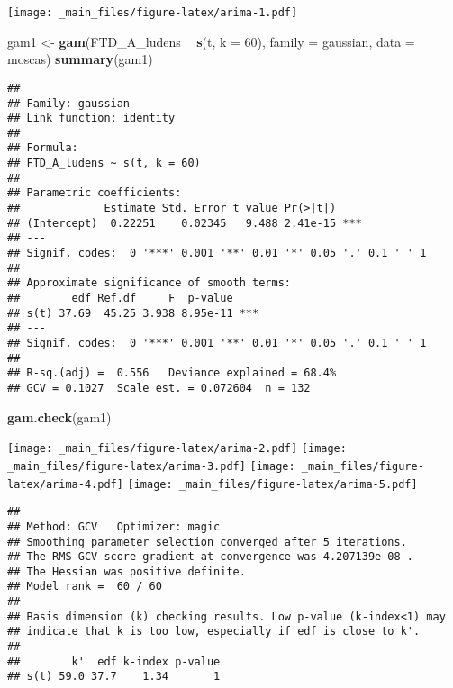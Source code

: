 \documentclass[
]{book}
\newenvironment{Shaded}{\begin{snugshade}}{\end{snugshade}}
\newcommand{\DataTypeTok}[1]{\textcolor[rgb]{0.13,0.29,0.53}{#1}}
\newcommand{\DecValTok}[1]{\textcolor[rgb]{0.00,0.00,0.81}{#1}}
\newcommand{\KeywordTok}[1]{\textcolor[rgb]{0.13,0.29,0.53}{\textbf{#1}}}
\newcommand{\NormalTok}[1]{#1}
\newcommand{\OperatorTok}[1]{\textcolor[rgb]{0.81,0.36,0.00}{\textbf{#1}}}
\newcommand{\StringTok}[1]{\textcolor[rgb]{0.31,0.60,0.02}{#1}}
\begin{document}
\begin{Shaded}
\end{Shaded}

\texttt{[image: \_main\_files/figure-latex/arima-1.pdf]}

\begin{Shaded}
\begin{Highlighting}[]
\NormalTok{gam1 <-}\StringTok{ }\KeywordTok{gam}\NormalTok{(FTD_A_ludens }\OperatorTok{~}\StringTok{ }\KeywordTok{s}\NormalTok{(t, }\DataTypeTok{k =} \DecValTok{60}\NormalTok{), }\DataTypeTok{family =}\NormalTok{ gaussian, }\DataTypeTok{data =}\NormalTok{ moscas)}
\KeywordTok{summary}\NormalTok{(gam1)}
\end{Highlighting}
\end{Shaded}

\begin{verbatim}
## 
## Family: gaussian 
## Link function: identity 
## 
## Formula:
## FTD_A_ludens ~ s(t, k = 60)
## 
## Parametric coefficients:
##             Estimate Std. Error t value Pr(>|t|)    
## (Intercept)  0.22251    0.02345   9.488 2.41e-15 ***
## ---
## Signif. codes:  0 '***' 0.001 '**' 0.01 '*' 0.05 '.' 0.1 ' ' 1
## 
## Approximate significance of smooth terms:
##        edf Ref.df     F  p-value    
## s(t) 37.69  45.25 3.938 8.95e-11 ***
## ---
## Signif. codes:  0 '***' 0.001 '**' 0.01 '*' 0.05 '.' 0.1 ' ' 1
## 
## R-sq.(adj) =  0.556   Deviance explained = 68.4%
## GCV = 0.1027  Scale est. = 0.072604  n = 132
\end{verbatim}

\begin{Shaded}
\begin{Highlighting}[]
\KeywordTok{gam.check}\NormalTok{(gam1)}
\end{Highlighting}
\end{Shaded}

\texttt{[image: \_main\_files/figure-latex/arima-2.pdf]} \texttt{[image: \_main\_files/figure-latex/arima-3.pdf]} \texttt{[image: \_main\_files/figure-latex/arima-4.pdf]} \texttt{[image: \_main\_files/figure-latex/arima-5.pdf]}

\begin{verbatim}
## 
## Method: GCV   Optimizer: magic
## Smoothing parameter selection converged after 5 iterations.
## The RMS GCV score gradient at convergence was 4.207139e-08 .
## The Hessian was positive definite.
## Model rank =  60 / 60 
## 
## Basis dimension (k) checking results. Low p-value (k-index<1) may
## indicate that k is too low, especially if edf is close to k'.
## 
##        k'  edf k-index p-value
## s(t) 59.0 37.7    1.34       1
\end{verbatim}
\end{document}
